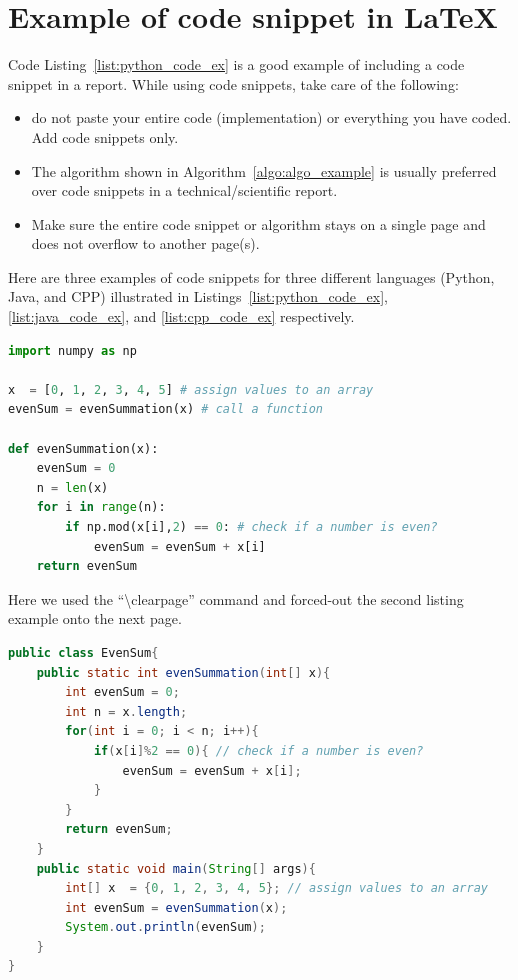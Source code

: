 \section{Example of code snippet  in \LaTeX}

Code Listing~\ref{list:python_code_ex} is a good example of including a code snippet in a report. While using code snippets, take care of the following:
\begin{itemize}
    \item do not paste your entire code (implementation) or everything you have coded. Add code snippets only. 
    \item The algorithm shown in Algorithm~\ref{algo:algo_example} is usually preferred over code snippets in a technical/scientific report. 
    \item Make sure the entire code snippet or algorithm stays on a single page and does not overflow to another page(s).  
\end{itemize}

Here are three examples of code snippets for three different languages (Python, Java, and CPP) illustrated in Listings~\ref{list:python_code_ex}, \ref{list:java_code_ex}, and \ref{list:cpp_code_ex} respectively.  

\begin{lstlisting}[language=Python, caption={Code snippet in \LaTeX ~and  this is a Python code example}, label=list:python_code_ex]
import numpy as np

x  = [0, 1, 2, 3, 4, 5] # assign values to an array
evenSum = evenSummation(x) # call a function

def evenSummation(x):
    evenSum = 0
    n = len(x)
    for i in range(n):
        if np.mod(x[i],2) == 0: # check if a number is even?
            evenSum = evenSum + x[i]
    return evenSum
\end{lstlisting}

Here we used  the ``\textbackslash clearpage'' command and forced-out the second listing example onto the next page. 
\clearpage  %
\begin{lstlisting}[language=Java, caption={Code snippet in \LaTeX ~and  this is a Java code example}, label=list:java_code_ex]
public class EvenSum{ 
    public static int evenSummation(int[] x){
        int evenSum = 0;
        int n = x.length;
        for(int i = 0; i < n; i++){
            if(x[i]%2 == 0){ // check if a number is even?
                evenSum = evenSum + x[i];
            }
        }
        return evenSum;     
    }
    public static void main(String[] args){ 
        int[] x  = {0, 1, 2, 3, 4, 5}; // assign values to an array
        int evenSum = evenSummation(x);
        System.out.println(evenSum);
    } 
} 
\end{lstlisting}


